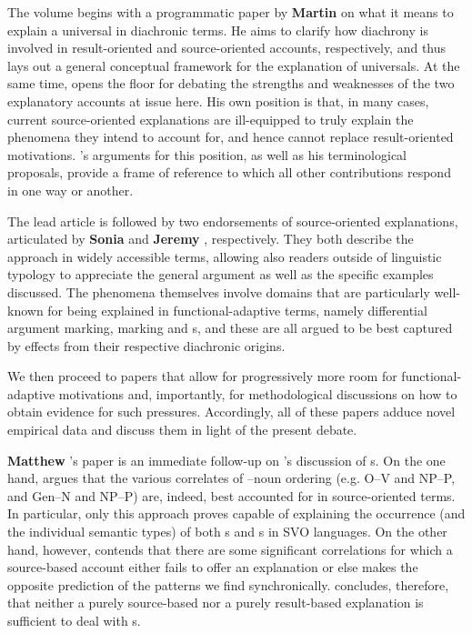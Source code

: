 \documentclass[output=paper]{langsci/langscibook}
\begin{document}
The volume begins with a programmatic paper by \textbf{Martin } on what it means to explain a universal in diachronic terms. He aims to clarify how diachrony is involved in result-oriented and source-oriented accounts, respectively, and thus lays out a general conceptual framework for the explanation of universals. At the same time,  opens the floor for debating the strengths and weaknesses of the two explanatory accounts at issue here. His own position is that, in many cases, current source-oriented explanations are ill-equipped to truly explain the phenomena they intend to account for, and hence cannot replace result-oriented motivations. ’s arguments for this position, as well as his terminological proposals, provide a frame of reference to which all other contributions respond in one way or another.

The lead article is followed by two endorsements of source-oriented explanations, articulated by \textbf{Sonia } and \textbf{Jeremy }, respectively. They both describe the approach in widely accessible terms, allowing also readers outside of linguistic typology to appreciate the general argument as well as the specific examples discussed. The phenomena themselves involve domains that are particularly well-known for being explained in functional-adaptive terms, namely differential argument marking,  marking and s, and these are all argued to be best captured by  effects from their respective diachronic origins.  

We then proceed to papers that allow for progressively more room for functional-adaptive motivations and, importantly, for methodological discussions on how to obtain evidence for such pressures. Accordingly, all of these papers adduce novel empirical data and discuss them in light of the present debate.

\textbf{Matthew }’s paper is an immediate follow-up on ’s discussion of s. On the one hand,  argues that the various correlates of –noun ordering (e.g. O–V and NP–P, and Gen–N and NP–P) are, indeed, best accounted for in source-oriented terms. In particular, only this approach proves capable of explaining the occurrence (and the individual semantic types) of both s and s in SVO languages. On the other hand, however,  contends that there are some significant correlations for which a source-based account either fails to offer an explanation or else makes the opposite prediction of the patterns we find synchronically.  concludes, therefore, that neither a purely source-based nor a purely result-based explanation is sufficient to deal with s.      
\end{document}
